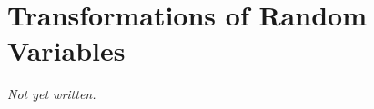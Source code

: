 \chapter{Transformations of Random Variables}\label{ch:transformations}


\textit{Not yet written.}
